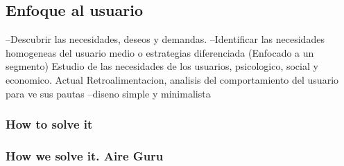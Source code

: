 \subsection{Enfoque al usuario}
--Descubrir las necesidades, deseos y demandas.
--Identificar las necesidades homogeneas del usuario medio o estrategias diferenciada (Enfocado a un segmento)
Estudio de las necesidades de los usuarios, psicologico, social y economico.
Actual
Retroalimentacion, analisis del comportamiento del usuario para ve sus pautas
--diseno simple y minimalista
\subsubsection{How to solve it} 


\subsubsection{How we solve it. Aire Guru} 
 
\begin{itemize}
    \done
    \crossed
    
\end{itemize}
 

\newpage
